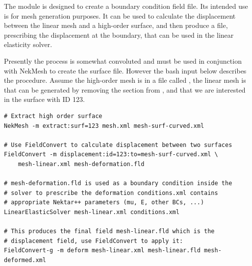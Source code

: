 The  module is designed to create a boundary condition field
file. Its intended use is for mesh generation purposes. It can be used to
calculate the displacement between the linear mesh and a high-order surface, and
then produce a  file, prescribing the displacement at the boundary,
that can be used in the linear elasticity solver.

Presently the process is somewhat convoluted and must be used in conjunction
with NekMesh to create the surface file. However the bash input below
describes the procedure. Assume the high-order mesh is in a file called
, the linear mesh is  that can be
generated by removing the  section from , and that
we are interested in the surface with ID 123.

\begin{lstlisting}[style=BashInputStyle]
# Extract high order surface
NekMesh -m extract:surf=123 mesh.xml mesh-surf-curved.xml

# Use FieldConvert to calculate displacement between two surfaces
FieldConvert -m displacement:id=123:to=mesh-surf-curved.xml \
    mesh-linear.xml mesh-deformation.fld

# mesh-deformation.fld is used as a boundary condition inside the
# solver to prescribe the deformation conditions.xml contains
# appropriate Nektar++ parameters (mu, E, other BCs, ...)
LinearElasticSolver mesh-linear.xml conditions.xml

# This produces the final field mesh-linear.fld which is the
# displacement field, use FieldConvert to apply it:
FieldConvert-g -m deform mesh-linear.xml mesh-linear.fld mesh-deformed.xml
\end{lstlisting}


